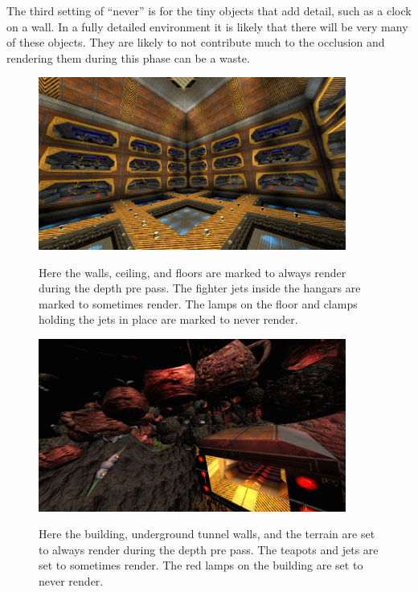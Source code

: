\documentclass[12pt]{ucthesis}
\newcommand{\captionfonts}{\small\bf\ssp}
\begin{document}
The third setting of ``never'' is for the tiny objects that add detail, such as a clock on a wall.
In a fully detailed environment it is likely that there will be very many of these objects.
They are likely to not contribute much to the occlusion and rendering them during this phase can be a waste.

\begin{figure}
\begin{center}
\includegraphics[width=0.9\textwidth]{Images/HangarCorner.jpg}
\captionfonts
\caption[Hangar Corner]{Here the walls, ceiling, and floors are marked to always render during the depth pre pass.  The fighter jets inside the hangars are marked to sometimes render.  The lamps on the floor and clamps holding the jets in place are marked to never render.}
\label{fig:hangar-corner}
\end{center}
\end{figure}

\begin{figure}
\begin{center}
\includegraphics[width=0.9\textwidth]{Images/HangarEntrance.jpg}
\captionfonts
\caption[Hangar Entrance]{Here the building, underground tunnel walls, and the terrain are set to always render during the depth pre pass.  The teapots and jets are set to sometimes render.  The red lamps on the building are set to never render.}
\label{fig:hangar-entrance_}
\end{center}
\end{figure}
\end{document}
